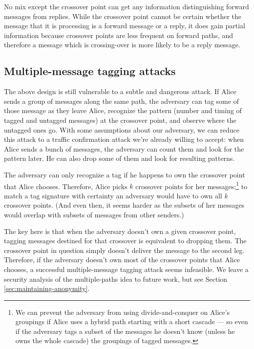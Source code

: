 \documentclass[11pt]{IEEEtran}
\begin{document}
No mix except the crossover point can get any information distinguishing
forward messages from replies. While the crossover point cannot be
certain whether the message that it is processing is a forward message
or a reply, it does gain partial information because crossover points
are less frequent on forward paths, and therefore a message which is
crossing-over is more likely to be a reply message.

\subsection{Multiple-message tagging attacks}
\label{subsec:multi-tagging}

The above design is still vulnerable to a subtle and dangerous
attack. If Alice sends a group of messages along the same path, the
adversary can tag some of those message as they leave Alice, recognize
the pattern (number and timing of tagged and untagged messages) at the
crossover point, and observe where the untagged ones go.
With some assumptions about our adversary, we can reduce
this attack to a traffic confirmation attack we're already willing to
accept: when Alice sends a bunch of messages, the adversary can count
them and look for the pattern later. He can also drop some of them and
look for resulting patterns.

The adversary can only recognize a tag if he happens to own the crossover
point that Alice chooses.
Therefore, Alice picks $k$ crossover points for her
messages;\footnote{
  We can prevent the adversary from using divide-and-conquer on Alice's
  groupings if Alice uses a hybrid path starting with a short cascade ---
  so even if the adversary tags a subset of the messages he doesn't know
  (unless he owns the whole cascade) the groupings of tagged messages.
}
to match a tag signature with certainty an adversary would
have to own all $k$ crossover points.  (And even then, it seems harder
as the subsets of her messages would overlap with subsets of
messages from other senders.)


The key here is that when the adversary doesn't own a given crossover
point, tagging messages destined for that crossover is equivalent to
dropping them.  The crossover point in question simply doesn't deliver
the message to the second leg. Therefore, if the adversary doesn't own
most of the crossover points that Alice chooses, a successful
multiple-message tagging attack seems infeasible.  We leave a security
analysis of the multiple-paths idea to future work, but see
Section \ref{sec:maintaining-anonymity}.
\end{document}
